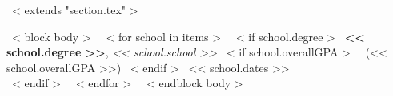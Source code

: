 ~< extends "section.tex" >~

~< block body >~
~< for school in items >~
  ~< if school.degree >~
    \textbf{<< school.degree >>}, \emph{<< school.school >>}%
    ~< if school.overallGPA >~
        ~(<< school.overallGPA >>)%
    ~< endif >~
    \hfill << school.dates >> \\
  ~< endif >~
~< endfor >~
~< endblock body >~
